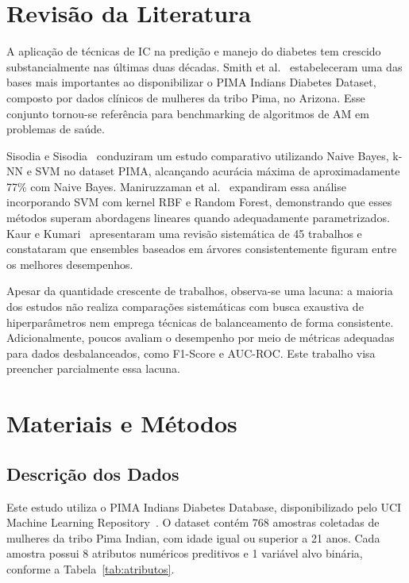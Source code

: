 \documentclass[conference]{IEEEtran}
\begin{document}
\section{Revis\~ao da Literatura}

A aplica\c{c}\~ao de t\'{e}cnicas de IC na predi\c{c}\~ao e manejo do diabetes tem crescido substancialmente nas \'{u}ltimas duas d\'{e}cadas. Smith et al.~\cite{smith1988} estabeleceram uma das bases mais importantes ao disponibilizar o PIMA Indians Diabetes Dataset, composto por dados cl\'{i}nicos de mulheres da tribo Pima, no Arizona. Esse conjunto tornou-se refer\^{e}ncia para benchmarking de algoritmos de AM em problemas de sa\'{u}de.

Sisodia e Sisodia~\cite{sisodia2018} conduziram um estudo comparativo utilizando Naive Bayes, k-NN e SVM no dataset PIMA, alcan\c{c}ando acur\'{a}cia m\'{a}xima de aproximadamente 77\% com Naive Bayes. Maniruzzaman et al.~\cite{maniruzzaman2017} expandiram essa an\'{a}lise incorporando SVM com kernel RBF e Random Forest, demonstrando que esses m\'{e}todos superam abordagens lineares quando adequadamente parametrizados. Kaur e Kumari~\cite{kaur2021} apresentaram uma revis\~ao sistem\'{a}tica de 45 trabalhos e constataram que ensembles baseados em \'{a}rvores consistentemente figuram entre os melhores desempenhos.

Apesar da quantidade crescente de trabalhos, observa-se uma lacuna: a maioria dos estudos n\~ao realiza compara\c{c}\~oes sistem\'{a}ticas com busca exaustiva de hiperpar\^{a}metros nem emprega t\'{e}cnicas de balanceamento de forma consistente. Adicionalmente, poucos avaliam o desempenho por meio de m\'{e}tricas adequadas para dados desbalanceados, como F1-Score e AUC-ROC. Este trabalho visa preencher parcialmente essa lacuna.

\section{Materiais e M\'{e}todos}

\subsection{Descri\c{c}\~ao dos Dados}

Este estudo utiliza o PIMA Indians Diabetes Database, disponibilizado pelo UCI Machine Learning Repository~\cite{smith1988,uci2024}. O dataset cont\'{e}m 768 amostras coletadas de mulheres da tribo Pima Indian, com idade igual ou superior a 21 anos. Cada amostra possui 8 atributos num\'{e}ricos preditivos e 1 vari\'{a}vel alvo bin\'{a}ria, conforme a Tabela~\ref{tab:atributos}.
\end{document}
